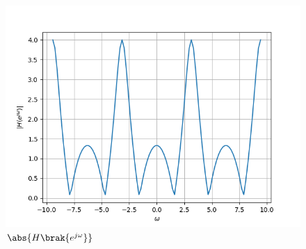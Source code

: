 \documentclass[journal,12pt,twocolumn]{IEEEtran}
\theoremstyle{remark}
\begin{document}
\begin{enumerate}[label=\thesection.\arabic*]
																																																						   \begin{figure}[H]
																																																						   \centering
																																																						   \includegraphics[width=\columnwidth]{figs/H(z)_3.5.png}
																																																						   \caption{$\abs{H\brak{e^{j\omega}}}$}
																																																						   \label{fig:H(z)_3.5}
																																																						   \end{figure}
																																																						   \end{enumerate}
\end{document}

